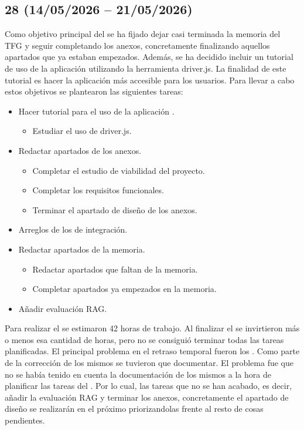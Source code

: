 \subsection{ 28 (14/05/2026 -- 21/05/2026)}
Como objetivo principal del  se ha fijado dejar casi terminada la memoria del TFG y seguir completando los anexos, concretamente finalizando aquellos apartados que ya estaban empezados. Además, se ha decidido incluir un tutorial de uso de la aplicación utilizando la herramienta driver.js. La finalidad de este tutorial es hacer la aplicación más accesible para los usuarios. Para llevar a cabo estos objetivos se plantearon las siguientes tareas:

\begin{itemize}
\tightlist
	\item Hacer tutorial para el uso de la aplicación .
	\begin{itemize}
	\tightlist
		\item Estudiar el uso de driver.js.
	\end{itemize}
	\item Redactar apartados de los anexos.
	\begin{itemize}
	\tightlist
		\item Completar el estudio de viabilidad del proyecto.
		\item Completar los requisitos funcionales.
		\item Terminar el apartado de diseño de los anexos.
	\end{itemize}
	\item Arreglos de los  de integración.
	\item Redactar apartados de la memoria.
	\begin{itemize}
	\tightlist
		\item Redactar apartados que faltan de la memoria.
		\item Completar apartados ya empezados en la memoria.
	\end{itemize}
	\item Añadir evaluación RAG.
\end{itemize}

Para realizar el  se estimaron 42 horas de trabajo. Al finalizar el  se invirtieron más o menos esa cantidad de horas, pero no se consiguió terminar todas las tareas planificadas. El principal problema en el retraso temporal fueron los . Como parte de la corrección de los mismos se tuvieron que documentar. El problema fue que no se había tenido en cuenta la documentación de los mismos a la hora de planificar las tareas del . Por lo cual, las tareas que no se han acabado, es decir, añadir la evaluación RAG y terminar los anexos, concretamente el apartado de diseño se realizarán en el próximo  priorizandolas frente al resto de cosas pendientes. 

